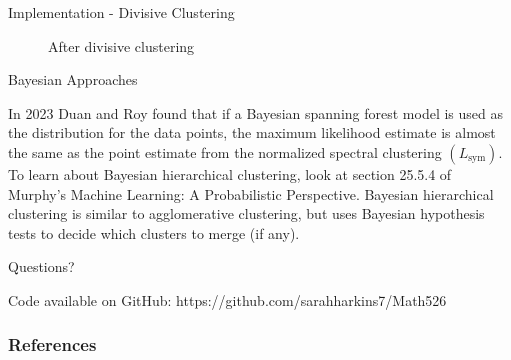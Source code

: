 \documentclass{beamer}
\begin{document}
\begin{frame}{Implementation - Divisive Clustering}
\begin{figure}
\begin{minipage}{.4\textwidth}
      \caption{After divisive clustering}
    \end{minipage}
    \end{figure}
\end{frame}

\begin{frame}{Bayesian Approaches}
\begin{outline}
    \1 In 2023 Duan and Roy found that if a Bayesian spanning forest model is used as the distribution for the data points, the maximum likelihood estimate is almost the same as the point estimate from the normalized spectral clustering $(L_{\textrm{sym}})$. \vspace{0.5cm}
    \1 To learn about Bayesian hierarchical clustering, look at section 25.5.4 of Murphy's Machine Learning: A Probabilistic Perspective. 
    \2 Bayesian hierarchical clustering is similar to agglomerative clustering, but uses Bayesian hypothesis tests to decide which clusters to merge (if any).
\end{outline}
\end{frame}

\begin{frame}{Questions?}

    Code available on GitHub: https://github.com/sarahharkins7/Math526
\end{frame}

\begin{frame}
    \frametitle{References}
    
    {\footnotesize
    }
    \nocite{*}
\end{frame}

\end{document}
